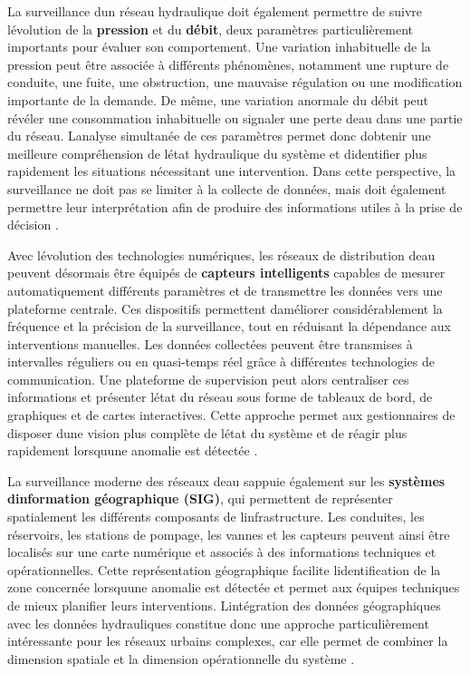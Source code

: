 \documentclass[12pt,a4paper,oneside]{report}
\begin{document}
La surveillance d\textquotesingle un réseau hydraulique doit également
permettre de suivre l\textquotesingle évolution de la \textbf{pression}
et du \textbf{débit}, deux paramètres particulièrement importants pour
évaluer son comportement. Une variation inhabituelle de la pression peut
être associée à différents phénomènes, notamment une rupture de
conduite, une fuite, une obstruction, une mauvaise régulation ou une
modification importante de la demande. De même, une variation anormale
du débit peut révéler une consommation inhabituelle ou signaler une
perte d\textquotesingle eau dans une partie du réseau.
L\textquotesingle analyse simultanée de ces paramètres permet donc
d\textquotesingle obtenir une meilleure compréhension de
l\textquotesingle état hydraulique du système et
d\textquotesingle identifier plus rapidement les situations nécessitant
une intervention. Dans cette perspective, la surveillance ne doit pas se
limiter à la collecte de données, mais doit également permettre leur
interprétation afin de produire des informations utiles à la prise de
décision \cite{ref34}.

Avec l\textquotesingle évolution des technologies numériques, les
réseaux de distribution d\textquotesingle eau peuvent désormais être
équipés de \textbf{capteurs intelligents} capables de mesurer
automatiquement différents paramètres et de transmettre les données vers
une plateforme centrale. Ces dispositifs permettent
d\textquotesingle améliorer considérablement la fréquence et la
précision de la surveillance, tout en réduisant la dépendance aux
interventions manuelles. Les données collectées peuvent être transmises
à intervalles réguliers ou en quasi-temps réel grâce à différentes
technologies de communication. Une plateforme de supervision peut alors
centraliser ces informations et présenter l\textquotesingle état du
réseau sous forme de tableaux de bord, de graphiques et de cartes
interactives. Cette approche permet aux gestionnaires de disposer
d\textquotesingle une vision plus complète de l\textquotesingle état du
système et de réagir plus rapidement lorsqu\textquotesingle une anomalie
est détectée \cite{ref20}.

La surveillance moderne des réseaux d\textquotesingle eau
s\textquotesingle appuie également sur les \textbf{systèmes
d\textquotesingle information géographique (SIG)}, qui permettent de
représenter spatialement les différents composants de
l\textquotesingle infrastructure. Les conduites, les réservoirs, les
stations de pompage, les vannes et les capteurs peuvent ainsi être
localisés sur une carte numérique et associés à des informations
techniques et opérationnelles. Cette représentation géographique
facilite l\textquotesingle identification de la zone concernée
lorsqu\textquotesingle une anomalie est détectée et permet aux équipes
techniques de mieux planifier leurs interventions.
L\textquotesingle intégration des données géographiques avec les données
hydrauliques constitue donc une approche particulièrement intéressante
pour les réseaux urbains complexes, car elle permet de combiner la
dimension spatiale et la dimension opérationnelle du système \cite{ref46}.
\end{document}
